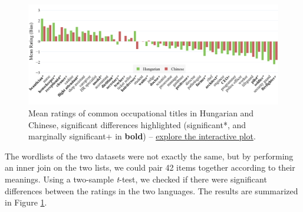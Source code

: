 \documentclass[11pt]{article}
\begin{document}


\begin{figure}[!ht]
  \centering
  \includegraphics[width=\linewidth]{../occupations_comparison}
  \caption{Mean ratings of common occupational titles in Hungarian and Chinese, significant differences highlighted (significant*, and marginally significant+ in \textbf{bold}) -- \href{https://htmlpreview.github.io/?https://github.com/partigabor/occupational-bias/blob/main/occupations_comparison.html}{explore the interactive plot}.}
  \label{fig:occupations_comparison}
\end{figure}


The wordlists of the two datasets were not exactly the same, but by performing an inner join on the two lists, we could pair 42 items together according to their meanings. Using a two-sample \textit{t}-test, we checked if there were significant differences between the ratings in the two languages. The results are summarized in Figure \ref{fig:occupations_comparison}.
\end{document}
